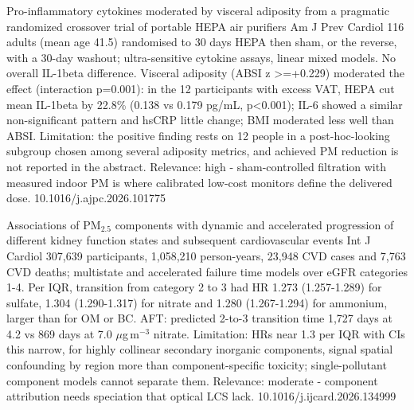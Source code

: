 \documentclass[10pt]{article}
\begin{document}
{Pro-inflammatory cytokines moderated by visceral adiposity from a pragmatic randomized crossover trial of portable HEPA air purifiers}
{Am J Prev Cardiol}
{116 adults (mean age 41.5) randomised to 30 days HEPA then sham, or the reverse, with a 30-day washout; ultra-sensitive cytokine assays, linear mixed models. No overall IL-1beta difference. Visceral adiposity (ABSI z >=+0.229) moderated the effect (interaction p=0.001): in the 12 participants with excess VAT, HEPA cut mean IL-1beta by 22.8\% (0.138 vs 0.179 pg/mL, p<0.001); IL-6 showed a similar non-significant pattern and hsCRP little change; BMI moderated less well than ABSI. Limitation: the positive finding rests on 12 people in a post-hoc-looking subgroup chosen among several adiposity metrics, and achieved PM reduction is not reported in the abstract. Relevance: high - sham-controlled filtration with measured indoor PM is where calibrated low-cost monitors define the delivered dose.}
{10.1016/j.ajpc.2026.101775}

{Associations of PM$_{2.5}$ components with dynamic and accelerated progression of different kidney function states and subsequent cardiovascular events}
{Int J Cardiol}
{307,639 participants, 1,058,210 person-years, 23,948 CVD cases and 7,763 CVD deaths; multistate and accelerated failure time models over eGFR categories 1-4. Per IQR, transition from category 2 to 3 had HR 1.273 (1.257-1.289) for sulfate, 1.304 (1.290-1.317) for nitrate and 1.280 (1.267-1.294) for ammonium, larger than for OM or BC. AFT: predicted 2-to-3 transition time 1,727 days at 4.2 vs 869 days at 7.0 $\mu$g\,m$^{-3}$ nitrate. Limitation: HRs near 1.3 per IQR with CIs this narrow, for highly collinear secondary inorganic components, signal spatial confounding by region more than component-specific toxicity; single-pollutant component models cannot separate them. Relevance: moderate - component attribution needs speciation that optical LCS lack.}
{10.1016/j.ijcard.2026.134999}

\par{}\baselineskip{}\baselineskip
{}
\end{document}
